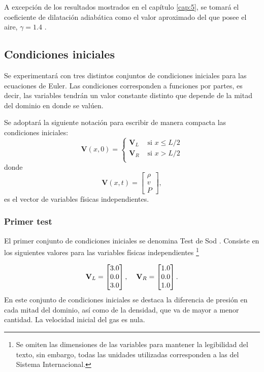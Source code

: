 A excepción de los resultados mostrados en el capítulo \ref{cap:5}, se tomará el coeficiente de dilatación adiabática como el valor aproximado del que posee el aire, $\gamma = 1.4$ \cite{LeVeque}.

\subsection{Condiciones iniciales}
Se experimentará con tres distintos conjuntos de condiciones iniciales para las ecuaciones de Euler. Las condiciones corresponden a funciones por partes, es decir, las variables tendrán un valor constante distinto que depende de la mitad del dominio en donde se valúen.

Se adoptará la siguiente notación para escribir de manera compacta las condiciones iniciales:
\begin{equation}
	\mathbf{V}(x,0) = 
	\begin{cases}
		\mathbf{V}_{L} & \text{ si } x \leq L/2\\
		\mathbf{V}_{R} & \text{ si } x > L/2\\
	\end{cases}
\end{equation}
donde
\begin{equation}
\mathbf{V}(x,t) = 
	\begin{bmatrix}
		\rho \\
		v \\
		P
	\end{bmatrix},
\end{equation}
es el vector de variables físicas independientes.

\subsubsection{Primer test}
El primer conjunto de condiciones iniciales se denomina Test de Sod \cite{thesis-euler-godunov}. Consiste en los siguientes valores para las variables físicas independientes \footnote{Se omiten las dimensiones de las variables para mantener la legibilidad del texto, sin embargo, todas las unidades utilizadas corresponden a las del Sistema Internacional.}

\begin{equation}
\mathbf{V}_L = 
	\begin{bmatrix}
		3.0\\
		0.0\\
		3.0
	\end{bmatrix},\hspace{4mm}
\mathbf{V}_R = 
	\begin{bmatrix}
		1.0\\
		0.0\\
		1.0
	\end{bmatrix}.
\end{equation}
En este conjunto de condiciones iniciales se destaca la diferencia de presión en cada mitad del dominio, así como de la densidad, que va de mayor a menor cantidad. La velocidad inicial del gas es nula.

